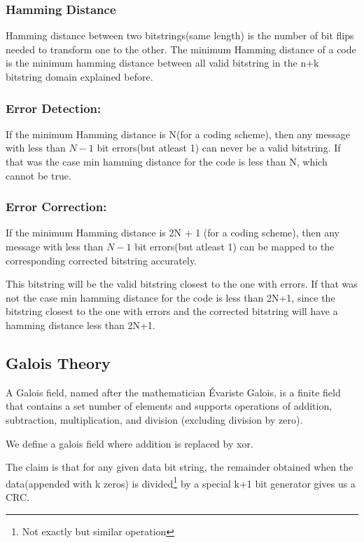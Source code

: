 \documentclass[12pt]{article}
\newcommand{\tbox}[1]{\noindent\fbox{\parbox{\textwidth}{#1}}}
\begin{document}
\subsubsection{Hamming Distance}

Hamming distance between two bitstrings(same length) is the number of bit flips needed to transform one to the other. 
The minimum Hamming distance of a code is the minimum hamming distance between all valid bitstring in the 
n+k bitstring domain explained before. 

\subsubsection{Error Detection:}

If the minimum Hamming distance is N(for a coding scheme), then any 
message with less than \(N-1\) bit errors(but atleast 1) can never be a valid bitstring. If that 
was the case min hamming distance for the code is less than N, which cannot be true. 
\subsubsection{Error Correction:}

If the minimum Hamming distance is 2N + 1 (for a coding scheme), then any 
message with less than \(N-1\) bit errors(but atleast 1) can be mapped to the corresponding corrected bitstring accurately.

This bitstring will be the valid bitstring closest to the one with errors. If that 
was not the case min hamming distance for the code is less than 2N+1, since the bitstring closest to the one with errors 
and the corrected bitstring will have a hamming distance less than 2N+1. 


\noindent\tbox{
    \begin{center}
    \textbf{\Huge Lecture 11}
    \end{center}
}
\subsection{Galois Theory}

A Galois field, named after the mathematician Évariste Galois, is a finite field that contains a set number of elements and supports operations of addition, subtraction, multiplication, and division (excluding division by zero). 

We define a galois field where addition is replaced by xor. 

The claim is that for any given data bit string, the remainder obtained when the data(appended with k zeros) is divided\footnote{Not exactly but similar operation} by 
a special k+1 bit generator gives us a CRC. 
\end{document}

